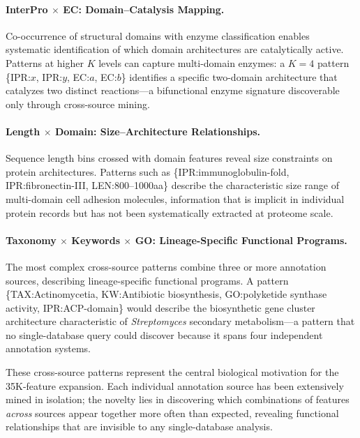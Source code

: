 \paragraph{InterPro $\times$ EC: Domain--Catalysis Mapping.}
Co-occurrence of structural domains with enzyme classification enables
systematic identification of which domain architectures are catalytically
active. Patterns at higher $K$ levels can capture multi-domain enzymes:
a $K{=}4$ pattern \{IPR:$x$, IPR:$y$, EC:$a$, EC:$b$\} identifies a specific
two-domain architecture that catalyzes two distinct reactions---a bifunctional
enzyme signature discoverable only through cross-source mining.

\paragraph{Length $\times$ Domain: Size--Architecture Relationships.}
Sequence length bins crossed with domain features reveal size constraints on
protein architectures. Patterns such as \{IPR:immunoglobulin-fold, IPR:fibronectin-III,
LEN:800--1000aa\} describe the characteristic size range of multi-domain
cell adhesion molecules, information that is implicit in individual protein
records but has not been systematically extracted at proteome scale.

\paragraph{Taxonomy $\times$ Keywords $\times$ GO: Lineage-Specific Functional
Programs.}
The most complex cross-source patterns combine three or more annotation
sources, describing lineage-specific functional programs. A pattern
\{TAX:Actinomycetia, KW:Antibiotic biosynthesis, GO:polyketide synthase
activity, IPR:ACP-domain\} would describe the biosynthetic gene cluster
architecture characteristic of \emph{Streptomyces} secondary metabolism---a
pattern that no single-database query could discover because it spans four
independent annotation systems.

These cross-source patterns represent the central biological motivation for
the 35K-feature expansion. Each individual annotation source has been
extensively mined in isolation; the novelty lies in discovering which
combinations of features \emph{across} sources appear together more often
than expected, revealing functional relationships that are invisible to any
single-database analysis.


%

